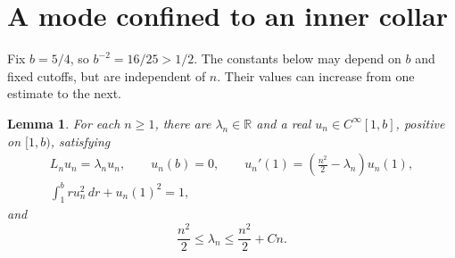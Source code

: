 \documentclass[11pt]{article}
\newtheorem{lemma}[theorem]{Lemma}
\newcommand{\RR}{\mathbb R}
\begin{document}
\section{A mode confined to an inner collar}

Fix \(b=5/4\), so \(b^{-2}=16/25>1/2\).
The constants below may depend on \(b\) and fixed cutoffs, but are independent
of \(n\). Their values can increase from one estimate to the next.

\begin{lemma}\label{lem:collar}
For each \(n\ge1\), there are \(\lambda_n\in\RR\) and a real
\(u_n\in C^\infty[1,b]\), positive on \([1,b)\), satisfying
\begin{equation}\label{eq:collar}
\begin{gathered}
L_nu_n=\lambda_nu_n,\qquad u_n(b)=0,\qquad
u_n'(1)=\left(\frac{n^2}{2}-\lambda_n\right)u_n(1),\\
\int_1^b r u_n^2\,dr+u_n(1)^2=1,
\end{gathered}
\end{equation}
and
\begin{equation}\label{eq:eigenvalue}
\frac{n^2}{2}\le\lambda_n\le\frac{n^2}{2}+Cn.
\end{equation}
\end{lemma}
\end{document}
